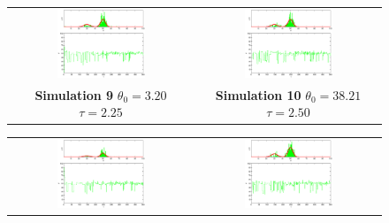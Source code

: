 \begin{figure}\label{fig: SimulationMetropolisHasting1}
\begin{tabular}{cc} 
\includegraphics[width=0.5\textwidth]{ImaginiLatex/MetropolisExample9.eps} &
\includegraphics[width=0.5\textwidth]{ImaginiLatex/MetropolisExample10.eps} \\
\textbf{Simulation 9} $\theta_0=    3.20$  $\tau=    2.25$  & \textbf{Simulation 10} $\theta_0=   38.21$  $\tau=    2.50$
\end{tabular}
\begin{tabular}{cc} 
\includegraphics[width=0.5\textwidth]{ImaginiLatex/MetropolisExample11.eps} &
\includegraphics[width=0.5\textwidth]{ImaginiLatex/MetropolisExample12.eps} \\

\end{tabular}
\end{figure}
